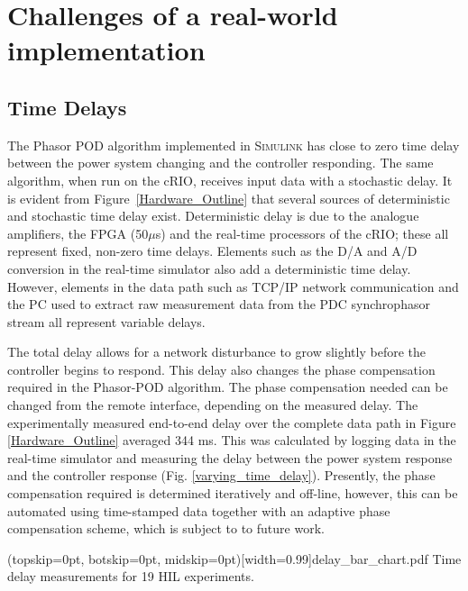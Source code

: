 \documentclass{ieeeaccess}
\begin{document}
\section{Challenges of a real-world implementation}\label{Challenges}

\subsection{Time Delays}

The Phasor POD algorithm implemented in \textsc{Simulink} has close to zero time delay between the power system changing and the controller responding. The same algorithm, when run on the cRIO, receives input data with a stochastic delay. It is evident from Figure~\ref{Hardware_Outline} that several sources of deterministic and stochastic time delay exist. Deterministic delay is due to the analogue amplifiers, the FPGA (50$\mu$s) and the real-time processors of the cRIO; these all represent fixed, non-zero time delays. Elements such as the D/A and A/D conversion in the real-time simulator also add a deterministic time delay. However, elements in the data path such as TCP/IP network communication and the PC used to extract raw measurement data from the PDC synchrophasor stream all represent variable delays. 

The total delay allows for a network disturbance to grow slightly before the controller begins to respond. This delay also changes the phase compensation required in the Phasor-POD algorithm. The phase compensation needed can be changed from the remote interface, depending on the measured delay. The experimentally measured end-to-end delay over the complete data path in Figure \ref{Hardware_Outline} averaged 344 ms. This was calculated by logging data in the real-time simulator and measuring the delay between the power system response and the controller response (Fig. \ref{varying_time_delay}). Presently, the phase compensation required is determined iteratively and off-line, however, this can be automated using time-stamped data together with an adaptive phase compensation scheme, which is subject to to future work.

\Figure[tbph](topskip=0pt, botskip=0pt, midskip=0pt)[width=0.99\columnwidth]{delay_bar_chart.pdf}
{Time delay measurements for 19 HIL experiments.\label{varying_time_delay}}
\end{document}
